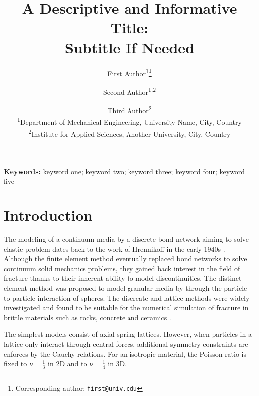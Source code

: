 \documentclass[10pt, onecolumn]{article}
\title{%
  \vspace{-1.5em}%
  \Large\bfseries
  A Descriptive and Informative Title:\\
  Subtitle If Needed
}
\author{%
  First Author\textsuperscript{1}\thanks{Corresponding author: \texttt{first@univ.edu}} \and
  Second Author\textsuperscript{1,2} \and
  Third Author\textsuperscript{2}
  \\[0.4em]
  \small\textsuperscript{1}Department of Mechanical Engineering, University Name, City, Country\\
  \small\textsuperscript{2}Institute for Applied Sciences, Another University, City, Country
}
\begin{document}
\maketitle
\thispagestyle{empty}  %

    \begin{abstract}
      \noindent

    \end{abstract}
    \vspace{0.5em}
    \noindent\textbf{Keywords:} keyword one; keyword two; keyword three;
    keyword four; keyword five
    \vspace{1em}


\section{Introduction}
\label{sec:intro}



The modeling of a continuum media by a discrete bond network aiming to solve elastic problem dates back to the work of Hrennikoff in the early 1940s \cite{Hrennikoff41}. Although the finite element method eventually replaced bond networks to solve continuum solid mechanics problems, they gained back interest in the field of fracture thanks to their inherent ability to model discontinuities.
The distinct element method was proposed to model granular media by \cite{cundall1979} through the particle to particle interaction of spheres.
The discreate and lattice methods were widely investigated and found to be suitable for the numerical simulation of fracture in brittle materials such as rocks, concrete and ceramics \cite{Schlangen1992, bazant1990, jirasek1994}.

The simplest models consist of axial spring lattices. However, when particles in a lattice only interact through central forces, additional symmetry constraints are enforces by the Cauchy relations. For an isotropic material, the Poisson ratio is fixed to $\nu = \frac{1}{3}$ in 2D and to $\nu = \frac{1}{4}$ in 3D.
\end{document}
